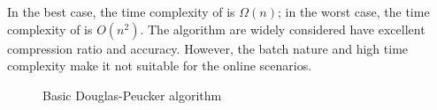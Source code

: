 In the best case, the time complexity of \dpa is $\Omega(n)$; in the worst case, the time complexity of \dpa is $O(n^2)$.
The \dpa algorithm are \textcolor[rgb]{0.00,0.07,1.00}{widely considered have excellent compression ratio and accuracy.}
However, the batch nature and high time complexity make it not suitable for the online scenarios.


\begin{figure}[tb!]
\begin{center}
{\small
\begin{minipage}{3.36in}
\myhrule \vspace{-1ex}
\vspace{-2.5ex}
\myhrule
\end{minipage}
}
\end{center}
\vspace{-3ex}
\caption{\small Basic Douglas-Peucker algorithm}
\label{alg:dp}
\vspace{-2ex}
\end{figure}





